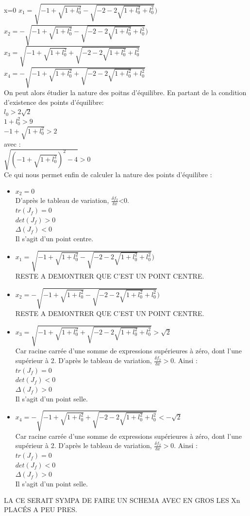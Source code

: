 \documentclass[10pt,a4paper]{article}
\begin{document}
x=0
$x_1=\sqrt{-1+\sqrt{1+l_0^2}-\sqrt{-2-2\sqrt{1+l_0^2}+l_0^2}})$\\
$x_2=-\sqrt{-1+\sqrt{1+l_0^2}-\sqrt{-2-2\sqrt{1+l_0^2}+l_0^2}})$\\
$x_3=\sqrt{-1+\sqrt{1+l_0^2}+\sqrt{-2-2\sqrt{1+l_0^2}+l_0^2}}$\\
$x_4=-\sqrt{-1+\sqrt{1+l_0^2}+\sqrt{-2-2\sqrt{1+l_0^2}+l_0^2}}$\\

On peut alors étudier la nature des poitns d'équilibre.
En partant de la condition d'existence des points d'équilibre:\\
$l_0>2\sqrt{2}$\\
$1+l_0^2>9$\\
$-1+\sqrt{1+l_0^2}>2$\\
avec :\\
$\sqrt{(-1+\sqrt{1+l_0^2})^2-4}>0$\\
Ce qui nous permet enfin de calculer la nature des points d'équilibre :
\begin{itemize}
\item $x_2=0$\\
D'après le tableau de variation, $\frac{\delta f_2}{\delta x}$<0.\\
$tr(J_f) = 0 $\\
$det(J_f) > 0 $\\
$\Delta(J_f) < 0$\\
Il s'agit d'un point centre.
\item $x_1=\sqrt{-1+\sqrt{1+l_0^2}-\sqrt{-2-2\sqrt{1+l_0^2}+l_0^2}})$\\
RESTE A DEMONTRER QUE C'EST UN POINT CENTRE.
\item $x_2=-\sqrt{-1+\sqrt{1+l_0^2}-\sqrt{-2-2\sqrt{1+l_0^2}+l_0^2}})$\\
RESTE A DEMONTRER QUE C'EST UN POINT CENTRE.
\item $x_3=\sqrt{-1+\sqrt{1+l_0^2}+\sqrt{-2-2\sqrt{1+l_0^2}+l_0^2}}>\sqrt{2}$\\
Car racine carrée d'une somme de expressions supérieures à zéro, dont l'une supérieur à 2.
D'après le tableau de variation, $\frac{\delta f_2}{\delta x}>0$. Ainsi :\\
$tr(J_f) = 0 $\\
$det(J_f) < 0 $\\
$\Delta(J_f) > 0$\\
Il s'agit d'un point selle.
\item $x_4=-\sqrt{-1+\sqrt{1+l_0^2}+\sqrt{-2-2\sqrt{1+l_0^2}+l_0^2}}<-\sqrt{2}$\\
Car racine carrée d'une somme de expressions supérieures à zéro, dont l'une supérieur à 2.
D'après le tableau de variation, $\frac{\delta f_2}{\delta x}>0$. Ainsi :\\
$tr(J_f) = 0 $\\
$det(J_f) < 0 $\\
$\Delta(J_f) > 0$\\
Il s'agit d'un point selle.
\end{itemize}
LA CE SERAIT SYMPA DE FAIRE UN SCHEMA AVEC EN GROS LES Xn PLACÉS A PEU PRES.
\end{document}
